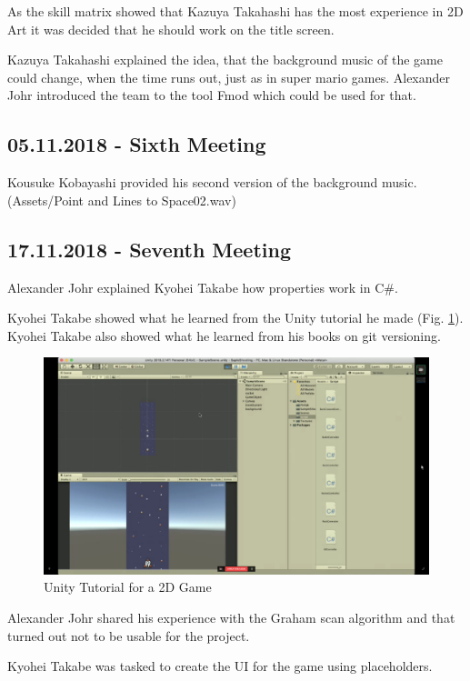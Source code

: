 As the skill matrix showed that Kazuya Takahashi has the most experience in 2D Art it was decided that he should work on the title screen.

Kazuya Takahashi explained the idea, that the background music of the game could change, when the time runs out, just as in super mario games. Alexander Johr introduced the team to the tool Fmod which could be used for that.


\subsection{05.11.2018  - Sixth Meeting}
Kousuke Kobayashi provided his second version of the background music. (Assets/Point and Lines to Space02.wav)


\subsection{17.11.2018 - Seventh Meeting}
Alexander Johr explained Kyohei Takabe how properties work in C\#.

Kyohei Takabe showed what he learned from the Unity tutorial he made  (Fig. \ref{fig:UnityTutorial}). Kyohei Takabe also showed what he learned from his books on git versioning.

\begin{figure}[htbp]
	\centering
		\includegraphics[width=1.00\textwidth]{img/UnityTutorial.png}
	\caption[Unity Tutorial for a 2D Game]{Unity Tutorial for a 2D Game}
	\label{fig:UnityTutorial}
\end{figure}

Alexander Johr shared his experience with the Graham scan algorithm and that turned out not to be usable for the project.

Kyohei Takabe was tasked to create the UI for the game using placeholders.


